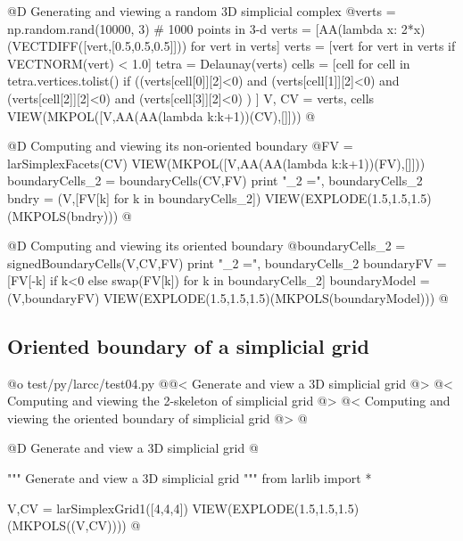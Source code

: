 \documentclass[11pt,oneside]{article}    %
\begin{document}
@D Generating and viewing a random 3D simplicial complex
@{verts = np.random.rand(10000, 3) # 1000 points in 3-d
verts = [AA(lambda x: 2*x)(VECTDIFF([vert,[0.5,0.5,0.5]])) for vert in verts]
verts = [vert for vert in verts if VECTNORM(vert) < 1.0]
tetra = Delaunay(verts)
cells = [cell for cell in tetra.vertices.tolist()
         if  ((verts[cell[0]][2]<0) and (verts[cell[1]][2]<0) 
                 and (verts[cell[2]][2]<0) and (verts[cell[3]][2]<0) ) ]
V, CV = verts, cells
VIEW(MKPOL([V,AA(AA(lambda k:k+1))(CV),[]]))
@}

@D Computing and viewing its non-oriented boundary 
@{FV = larSimplexFacets(CV)
VIEW(MKPOL([V,AA(AA(lambda k:k+1))(FV),[]]))
boundaryCells_2 = boundaryCells(CV,FV)
print "\nboundaryCells_2 =\n", boundaryCells_2
bndry = (V,[FV[k] for k in boundaryCells_2])
VIEW(EXPLODE(1.5,1.5,1.5)(MKPOLS(bndry)))
@}

@D Computing and viewing its oriented boundary
@{boundaryCells_2 = signedBoundaryCells(V,CV,FV)
print "\nboundaryCells_2 =\n", boundaryCells_2
boundaryFV = [FV[-k] if k<0 else swap(FV[k]) for k in boundaryCells_2]
boundaryModel = (V,boundaryFV)
VIEW(EXPLODE(1.5,1.5,1.5)(MKPOLS(boundaryModel)))
@}

\subsection{Oriented boundary of a simplicial grid}

@o test/py/larcc/test04.py
@{@< Generate and view a 3D simplicial grid @>
@< Computing and viewing the 2-skeleton of simplicial grid @>
@< Computing and viewing the oriented boundary of simplicial grid @>
@}


@D Generate and view a 3D simplicial grid
@{""" Generate and view a 3D simplicial grid """
from larlib import *

V,CV = larSimplexGrid1([4,4,4])
VIEW(EXPLODE(1.5,1.5,1.5)(MKPOLS((V,CV))))
@}
\end{document}

